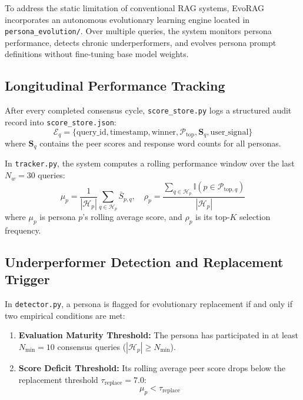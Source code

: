To address the static limitation of conventional RAG systems, EvoRAG incorporates an autonomous evolutionary learning engine located in \texttt{persona\_evolution/}. Over multiple queries, the system monitors persona performance, detects chronic underperformers, and evolves persona prompt definitions without fine-tuning base model weights.

\subsection{Longitudinal Performance Tracking}
After every completed consensus cycle, \texttt{score\_store.py} logs a structured audit record into \texttt{score\_store.json}:
\begin{equation}
\mathcal{E}_q = \{ \text{query\_id}, \text{timestamp}, \text{winner}, \mathcal{P}_{\text{top}}, \mathbf{S}_q, \text{user\_signal} \}
\end{equation}
where $\mathbf{S}_q$ contains the peer scores and response word counts for all personas.

In \texttt{tracker.py}, the system computes a rolling performance window over the last $N_w = 30$ queries:
\begin{equation}
\mu_p = \frac{1}{|\mathcal{H}_p|} \sum_{q \in \mathcal{H}_p} \bar{S}_{p,q}, \quad \rho_p = \frac{\sum_{q \in \mathcal{H}_p} \mathbb{I}(p \in \mathcal{P}_{\text{top}, q})}{|\mathcal{H}_p|}
\end{equation}
where $\mu_p$ is persona $p$'s rolling average score, and $\rho_p$ is its top-$K$ selection frequency.

\subsection{Underperformer Detection and Replacement Trigger}
In \texttt{detector.py}, a persona is flagged for evolutionary replacement if and only if two empirical conditions are met:
\begin{enumerate}
    \item \textbf{Evaluation Maturity Threshold:} The persona has participated in at least $N_{\text{min}} = 10$ consensus queries ($|\mathcal{H}_p| \ge N_{\text{min}}$).
    \item \textbf{Score Deficit Threshold:} Its rolling average peer score drops below the replacement threshold $\tau_{\text{replace}} = 7.0$:
    \begin{equation}
    \mu_p < \tau_{\text{replace}}
    \end{equation}
\end{enumerate}

